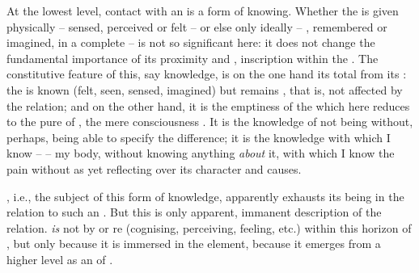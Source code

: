 
\pa \imm At the lowest level,  contact with an  is a form of
knowing.  Whether the  is given physically -- sensed, perceived or
felt -- or else only ideally -- , remembered or imagined, in a
complete  -- is not so significant here: it does not change the
fundamental importance of its proximity and , inscription within
the \hoa.  The constitutive feature of this, say  knowledge, is on
the one hand its total  from its : the 
is known (felt, seen, sensed, imagined) but remains , that is, not
affected by the relation; and on the other hand, it is the emptiness of the
 which here reduces to the pure  of
 , the mere consciousness . It is
the knowledge of  not being  without, perhaps, being able to
specify the difference; it is the knowledge with which I know --
 -- my body, without
knowing anything {\em about} it, with which I  know the pain
without as yet reflecting over its character and causes. 

, i.e., the subject of this form of knowledge, apparently exhausts
its being in the relation to such an . But this is only
apparent, immanent description of the relation.  {\em is} not by
 or re (cognising, perceiving, feeling, etc.) within this
horizon of , but only because it is immersed in the
  element, because it emerges from a higher level as
an  of .
  
